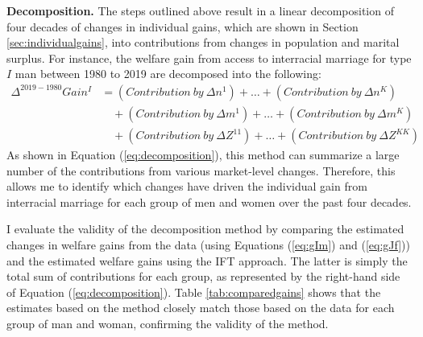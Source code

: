 \vspace{5mm} 
\noindent \textbf{Decomposition.} The steps outlined above result in a linear decomposition of four decades of changes in individual gains, which are shown in Section \ref{sec:individualgains}, into contributions from changes in population and  marital surplus. For instance, the welfare gain from access to interracial marriage for type $I$ man between 1980 to 2019 are decomposed into the following:
	\begin{align}
	\Delta^{2019-1980} Gain^I &= (Contribution \: by \: \Delta n^1) + \ldots + (Contribution \: by \: \Delta n^K)  \nonumber \\
	&\quad + (Contribution \: by \: \Delta m^1) + \ldots + (Contribution \: by \: \Delta m^K)  \nonumber  \\ 
	&\quad + (Contribution \: by \: \Delta Z^{11}) + \ldots + (Contribution \: by \: \Delta Z^{KK}) \label{eq:decomposition}
\end{align}
As shown in Equation (\ref{eq:decomposition}), this method can summarize a large number of the contributions from various market-level changes. Therefore, this allows me to identify which changes have driven the individual gain from interracial marriage for each group of men and women over the past four decades. 



I evaluate the validity of the decomposition method by comparing the estimated changes in welfare gains from the data (using Equations (\ref{eq:gIm}) and (\ref{eq:gJf})) and the estimated welfare gains using the IFT approach. The latter is simply the total sum of contributions for each group, as represented by the right-hand side of Equation (\ref{eq:decomposition}). Table \ref{tab:comparedgains} shows that the estimates based on the method closely match those based on the data for each group of man and woman, confirming the validity of the method. 

